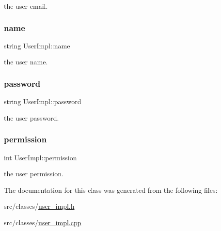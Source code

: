 the user email. \mbox{\label{classUserImpl_abdfed2d2311d220d014cc1a9e620a3cd}} 
\subsubsection{\texorpdfstring{name}{name}}
{\footnotesize\ttfamily string User\+Impl\+::name\hspace{0.3cm}{\ttfamily [protected]}}

the user name. \mbox{\label{classUserImpl_a43fad715265a41dfd46beebe6df25f9c}} 
\subsubsection{\texorpdfstring{password}{password}}
{\footnotesize\ttfamily string User\+Impl\+::password\hspace{0.3cm}{\ttfamily [protected]}}

the user password. \mbox{\label{classUserImpl_aa5291056890b6c1a6c92df0c168b219d}} 
\subsubsection{\texorpdfstring{permission}{permission}}
{\footnotesize\ttfamily int User\+Impl\+::permission\hspace{0.3cm}{\ttfamily [protected]}}

the user permission. 

The documentation for this class was generated from the following files\+:\begin{DoxyCompactItemize}
\item 
src/classes/\hyperlink{user__impl_8h}{user\+\_\+impl.\+h}\item 
src/classes/\hyperlink{user__impl_8cpp}{user\+\_\+impl.\+cpp}\end{DoxyCompactItemize}
